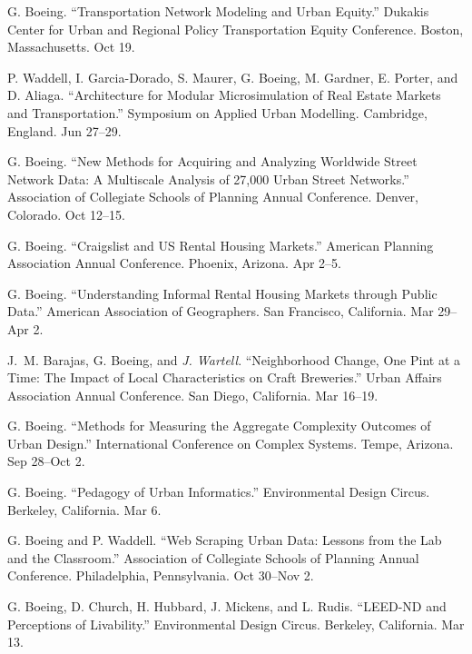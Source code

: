 \documentclass[11pt,a4paper]{report} %
\begin{document}
\begin{tablist}
\item[2018] \tab{}G. Boeing. \enquote{Transportation Network Modeling and Urban Equity.} Dukakis Center for Urban and Regional Policy Transportation Equity Conference. Boston, Massachusetts. Oct 19.

\item[2018] \tab{}P. Waddell, I. Garcia-Dorado, S. Maurer, G. Boeing, M. Gardner, E. Porter, and D. Aliaga. \enquote{Architecture for Modular Microsimulation of Real Estate Markets and Transportation.} Symposium on Applied Urban Modelling. Cambridge, England. Jun 27--29.

\item[2017] \tab{}G. Boeing. \enquote{New Methods for Acquiring and Analyzing Worldwide Street Network Data: A Multiscale Analysis of 27,000 Urban Street Networks.} Association of Collegiate Schools of Planning Annual Conference. Denver, Colorado. Oct 12--15.

\item[2016] \tab{}G. Boeing. \enquote{Craigslist and US Rental Housing Markets.} American Planning Association Annual Conference. Phoenix, Arizona. Apr 2--5.

\item[2016] \tab{}G. Boeing. \enquote{Understanding Informal Rental Housing Markets through Public Data.} American Association of Geographers. San Francisco, California. Mar 29--Apr 2.

\item[2016] \tab{}J.~M. Barajas, G. Boeing, and \textit{J. Wartell}. \enquote{Neighborhood Change, One Pint at a Time: The Impact of Local Characteristics on Craft Breweries.} Urban Affairs Association Annual Conference. San Diego, California. Mar 16--19.

\item[2015] \tab{}G. Boeing. \enquote{Methods for Measuring the Aggregate Complexity Outcomes of Urban Design.} International Conference on Complex Systems. Tempe, Arizona. Sep 28--Oct 2.

\item[2015] \tab{}G. Boeing. \enquote{Pedagogy of Urban Informatics.} Environmental Design Circus. Berkeley, California. Mar 6.

\item[2014] \tab{}G. Boeing and P. Waddell. \enquote{Web Scraping Urban Data: Lessons from the Lab and the Classroom.} Association of Collegiate Schools of Planning Annual Conference. Philadelphia, Pennsylvania. Oct 30--Nov 2.

\item[2014] \tab{}G. Boeing, D. Church, H. Hubbard, J. Mickens, and L. Rudis. \enquote{LEED-ND and Perceptions of Livability.} Environmental Design Circus. Berkeley, California. Mar 13.

\end{tablist}
\end{document}
